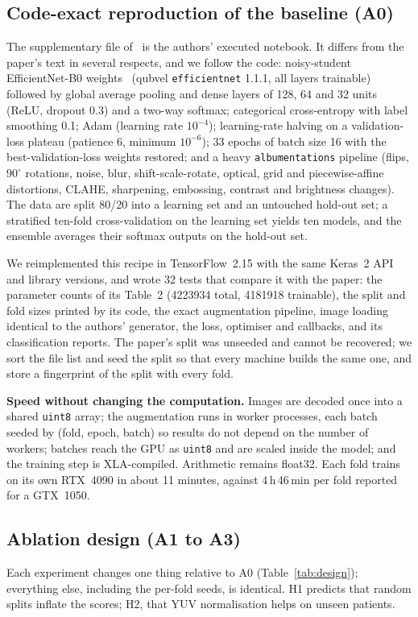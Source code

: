 \documentclass[conference]{IEEEtran}
\begin{document}
\subsection{Code-exact reproduction of the baseline (A0)}
The supplementary file of~\cite{marques2022} is the authors' executed notebook. It differs from the paper's text in several respects, and we follow the code: noisy-student EfficientNet-B0 weights~\cite{tan2019,xie2020} (qubvel \texttt{efficientnet} 1.1.1, all layers trainable) followed by global average pooling and dense layers of 128, 64 and 32 units (ReLU, dropout 0.3) and a two-way softmax; categorical cross-entropy with label smoothing 0.1; Adam (learning rate $10^{-4}$); learning-rate halving on a validation-loss plateau (patience 6, minimum $10^{-6}$); 33 epochs of batch size 16 with the best-validation-loss weights restored; and a heavy \texttt{albumentations} pipeline (flips, $90^\circ$ rotations, noise, blur, shift-scale-rotate, optical, grid and piecewise-affine distortions, CLAHE, sharpening, embossing, contrast and brightness changes). The data are split 80/20 into a learning set and an untouched hold-out set; a stratified ten-fold cross-validation on the learning set yields ten models, and the ensemble averages their softmax outputs on the hold-out set.

We reimplemented this recipe in TensorFlow~2.15 with the same Keras~2 API and library versions, and wrote 32 tests that compare it with the paper: the parameter counts of its Table~2 (\num{4223934} total, \num{4181918} trainable), the split and fold sizes printed by its code, the exact augmentation pipeline, image loading identical to the authors' generator, the loss, optimiser and callbacks, and its classification reports. The paper's split was unseeded and cannot be recovered; we sort the file list and seed the split so that every machine builds the same one, and store a fingerprint of the split with every fold.

\textbf{Speed without changing the computation.} Images are decoded once into a shared \texttt{uint8} array; the augmentation runs in worker processes, each batch seeded by (fold, epoch, batch) so results do not depend on the number of workers; batches reach the GPU as \texttt{uint8} and are scaled inside the model; and the training step is XLA-compiled. Arithmetic remains float32. Each fold trains on its own RTX~4090 in about 11 minutes, against 4\,h\,46\,min per fold reported for a GTX~1050.

\subsection{Ablation design (A1 to A3)}
Each experiment changes one thing relative to A0 (Table~\ref{tab:design}); everything else, including the per-fold seeds, is identical. H1 predicts that random splits inflate the scores; H2, that YUV normalisation helps on unseen patients.
\end{document}
